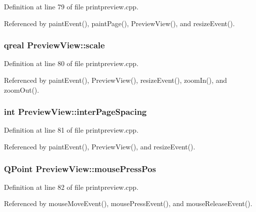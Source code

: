 Definition at line 79 of file printpreview.cpp.

Referenced by paint\-Event(), paint\-Page(), Preview\-View(), and resize\-Event().
\subsubsection{\setlength{\rightskip}{0pt plus 5cm}qreal {\bf Preview\-View::scale}\hspace{0.3cm}{\tt  [private]}}\label{classPreviewView_30bcb41e458b4e4508c12c02e405978c}




Definition at line 80 of file printpreview.cpp.

Referenced by paint\-Event(), Preview\-View(), resize\-Event(), zoom\-In(), and zoom\-Out().
\subsubsection{\setlength{\rightskip}{0pt plus 5cm}int {\bf Preview\-View::inter\-Page\-Spacing}\hspace{0.3cm}{\tt  [private]}}\label{classPreviewView_4e06de4fc11fe66a49ccb3f4857e113b}




Definition at line 81 of file printpreview.cpp.

Referenced by paint\-Event(), Preview\-View(), and resize\-Event().
\subsubsection{\setlength{\rightskip}{0pt plus 5cm}QPoint {\bf Preview\-View::mouse\-Press\-Pos}\hspace{0.3cm}{\tt  [private]}}\label{classPreviewView_a2617f090de7328485f926f4e6800ba2}




Definition at line 82 of file printpreview.cpp.

Referenced by mouse\-Move\-Event(), mouse\-Press\-Event(), and mouse\-Release\-Event().
